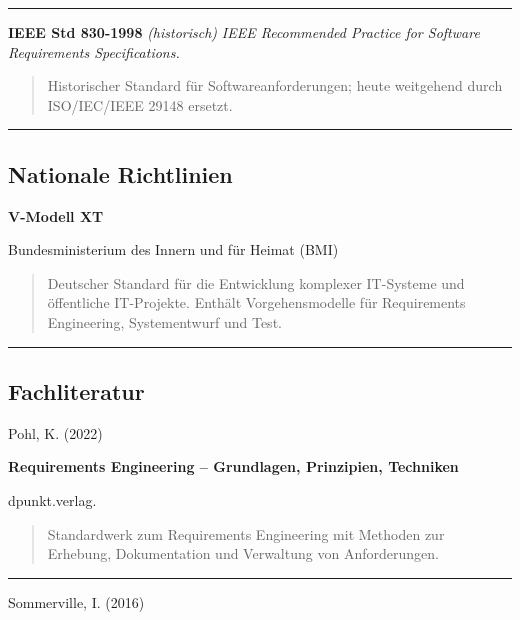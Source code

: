 \begin{center}\rule{0.5\linewidth}{0.5pt}\end{center}

\textbf{IEEE Std 830-1998} \emph{(historisch)} \emph{IEEE Recommended
Practice for Software Requirements Specifications.}

\begin{quote}
Historischer Standard für Softwareanforderungen; heute weitgehend durch
ISO/IEC/IEEE 29148 ersetzt.
\end{quote}

\begin{center}\rule{0.5\linewidth}{0.5pt}\end{center}

\subsection{Nationale Richtlinien}\label{nationale-richtlinien}

\textbf{V-Modell XT}

Bundesministerium des Innern und für Heimat (BMI)

\begin{quote}
Deutscher Standard für die Entwicklung komplexer IT-Systeme und
öffentliche IT-Projekte. Enthält Vorgehensmodelle für Requirements
Engineering, Systementwurf und Test.
\end{quote}

\begin{center}\rule{0.5\linewidth}{0.5pt}\end{center}

\subsection{Fachliteratur}\label{fachliteratur}

Pohl, K. (2022)

\textbf{Requirements Engineering -- Grundlagen, Prinzipien, Techniken}

dpunkt.verlag.

\begin{quote}
Standardwerk zum Requirements Engineering mit Methoden zur Erhebung,
Dokumentation und Verwaltung von Anforderungen.
\end{quote}

\begin{center}\rule{0.5\linewidth}{0.5pt}\end{center}

Sommerville, I. (2016)

